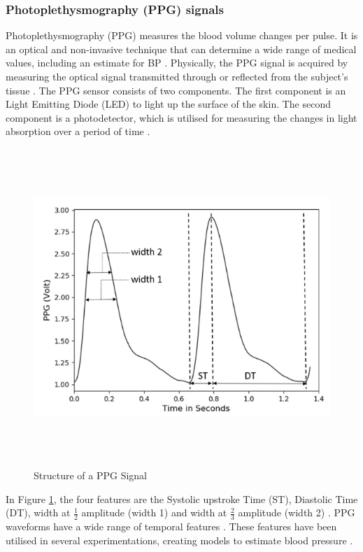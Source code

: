 \subsubsection{Photoplethysmography (PPG) signals} 
Photoplethysmography (PPG) measures the blood volume changes per pulse. It is an optical and non-invasive 
technique that can determine a wide range of medical values, including an estimate for BP \cite{ElHajj2020}. 
Physically, the PPG signal is acquired by measuring the optical signal transmitted through or reflected  
from  the  subject's tissue \cite{Tanveer2018}. The PPG sensor consists of two components. The first component 
is an Light Emitting Diode (LED) to light up the surface of the skin. The second component is a photodetector, 
which is utilised for measuring the changes in light absorption over a period of time \cite{ElHajj2020} \cite{Kumar2015}.
\begin{figure}[H]
    \centering
    \includegraphics[width=12cm,height=12cm,keepaspectratio]{Background/ppg.png}
    \caption{Structure of a PPG Signal \cite{ElHajj2020}}
    \label{ppg}
\end{figure} \noindent In Figure \ref{ppg}, the four features 
are the Systolic upstroke Time (ST), Diastolic Time (DT), 
width at $\frac{1}{2}$ amplitude (width 1) and width at $\frac{2}{3}$ 
amplitude (width 2) \cite{ElHajj2020}. PPG waveforms have a wide range of 
temporal features \cite{ElHajj2020}. These features have been utilised 
in several experimentations, creating  models  to  estimate blood 
pressure \cite{Pradenas2020}.


